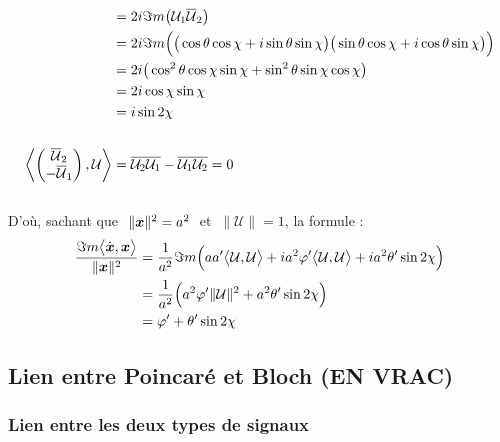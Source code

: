 \begin{annexe}
\begin{demo}
\begin{align*}
		&= 2i\Im m\big(\mathcal{U}_1 \overline{\mathcal{U}}_2\big) \\
		&= 2i\Im m\Big(\big( \cos\theta \cos\chi + i \sin\theta \sin\chi \big) \big( \sin\theta \cos\chi + i \cos\theta \sin\chi \big)\Big) \\
		&= 2i\big(\cos^2\theta \cos\chi \sin\chi + \sin^2\theta \sin\chi \cos\chi \big) \\
		&= 2i \cos\chi \sin\chi \\
		&= i\sin2\chi 
		\\ \\
		\left\langle \begin{pmatrix} \overline{\mathcal{U}}_2 \\ -\overline{\mathcal{U}}_1 \end{pmatrix}, \mathcal{U} \right\rangle &= \overline{\mathcal{U}_2\mathcal{U}_1} - \overline{\mathcal{U}_1\mathcal{U}_2} = 0
	\end{align*}
	\\
	D'où, sachant que $\ \|\boldsymbol{x}\|^2=a^2\ $ et $\ \|\mathcal{U}\|=1$, la formule :
	\begin{align*}
		\frac{\Im m\big\langle \dot{\boldsymbol{x}}, \boldsymbol{x}\big\rangle}{\|\boldsymbol{x}\|^2} &= \frac{1}{a^2}\Im m\Big(aa' \big\langle \mathcal{U}, \mathcal{U}\big\rangle  + ia^2\varphi' \big\langle \mathcal{U}, \mathcal{U}\big\rangle + ia^2\theta' \sin2\chi \Big) \\
		&= \frac{1}{a^2} \Big( a^2\varphi' \|\mathcal{U}\|^2 + a^2\theta' \sin2\chi \Big) \\
		&= \varphi' + \theta' \sin2\chi
	\end{align*}
\end{demo}
\skipl


\subsection{Lien entre Poincaré et Bloch (EN VRAC)}

\subsubsection{Lien entre les deux types de signaux}


\end{annexe}
